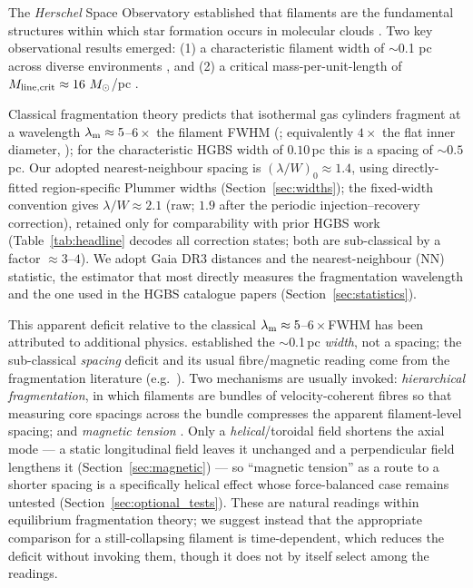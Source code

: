 \documentclass[usenatbib,twoside,twocolumn]{mnras}
\begin{document}
The \textit{Herschel} Space Observatory established that filaments are the fundamental structures within which star formation occurs in molecular clouds \citep{Andre2010}. Two key observational results emerged: (1) a characteristic filament width of $\sim$0.1 pc across diverse environments \citep{Arzoumanian2011}, and (2) a critical mass-per-unit-length of $M_{\rm line,crit} \approx 16~M_\odot$/pc \citep{Ostriker1964}.

Classical fragmentation theory \citep{Inutsuka1992} predicts that isothermal gas cylinders fragment at a wavelength $\lambda_{\rm m}\approx5$--$6\times$ the filament FWHM (\citealt{Fischera2012}; equivalently $4\times$ the flat inner diameter, \citealt{Inutsuka1992}); for the characteristic HGBS width of $0.10$\,pc this is a spacing of $\sim0.5$\,pc. Our adopted nearest-neighbour spacing is $(\lambda/W)_0\approx1.4$, using directly-fitted region-specific Plummer widths (Section~\ref{sec:widths}); the fixed-width convention gives $\lambda/W\approx2.1$ (raw; $1.9$ after the periodic injection--recovery correction), retained only for comparability with prior HGBS work (Table~\ref{tab:headline} decodes all correction states; both are sub-classical by a factor $\approx3$--$4$). We adopt Gaia DR3 distances \citep{Zhang2023} and the nearest-neighbour (NN) statistic, the estimator that most directly measures the fragmentation wavelength and the one used in the HGBS catalogue papers \citep{Konyves2015,Konyves2020} (Section~\ref{sec:statistics}).

This apparent deficit relative to the classical $\lambda_{\rm m}\approx5$--$6\times$FWHM has been attributed to additional physics. \citet{Arzoumanian2019} established the $\sim$0.1\,pc \emph{width}, not a spacing; the sub-classical \emph{spacing} deficit and its usual fibre/magnetic reading come from the fragmentation literature (e.g.\ \citealt{Fischera2012,Zhang2023cal}). Two mechanisms are usually invoked: \emph{hierarchical fragmentation}, in which filaments are bundles of velocity-coherent fibres \citep{Hacar2013,Hacar2018,Yang2024} so that measuring core spacings across the bundle compresses the apparent filament-level spacing; and \emph{magnetic tension} \citep{Nakamura1993}. Only a \emph{helical}/toroidal field shortens the axial mode --- a static longitudinal field leaves it unchanged and a perpendicular field lengthens it (Section~\ref{sec:magnetic}) --- so ``magnetic tension'' as a route to a shorter spacing is a specifically helical effect whose force-balanced case remains untested (Section~\ref{sec:optional_tests}). These are natural readings within equilibrium fragmentation theory; we suggest instead that the appropriate comparison for a still-collapsing filament is time-dependent, which reduces the deficit without invoking them, though it does not by itself select among the readings.
\end{document}
